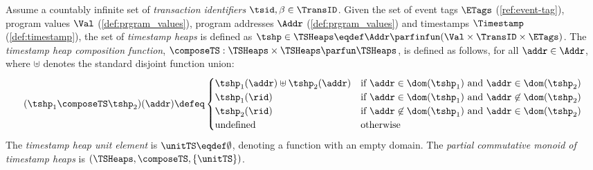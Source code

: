 \begin{defn}
\label{def:timestamp_heaps}
Assume a countably infinite set of \emph{transaction identifiers} $\tsid, \beta \in \TransID$.
Given the set of event tags $\ETags$ (\ref{ref:event-tag}), program values $\Val$ (\ref{def:prgram_values}), program addresses $\Addr$ (\ref{def:prgram_values}) and timestamps \(\Timestamp\) (\ref{def:timestamp}), the set of \emph{timestamp heaps} is defined as $\tshp \in \TSHeaps \eqdef \Addr \parfinfun (\Val \times \TransID \times \ETags)$.
The \emph{timestamp heap composition function}, $\composeTS: \TSHeaps \times \TSHeaps \parfun \TSHeaps$, is defined as follows, for all $\addr \in \Addr$, where $\uplus$ denotes the standard disjoint function union:
%
\[
	(\tshp_1 \composeTS \tshp_2)(\addr) \defeq 
	\begin{cases}
		\tshp_1(\addr) \uplus \tshp_2(\addr) & \text{if } \addr \in \dom(\tshp_1) \text{ and } \addr \in \dom(\tshp_2) \\
		\tshp_1(\rid) & \text{if } \addr \in \dom(\tshp_1) \text{ and } \addr \not\in \dom(\tshp_2) \\
		\tshp_2(\rid) & \text{if } \addr \not\in \dom(\tshp_1) \text{ and } \addr \in \dom(\tshp_2) \\
		\text{undefined} & \text{otherwise}
	\end{cases}
\]
%
The \emph{timestamp heap unit element} is $\unitTS \eqdef \emptyset$, denoting a function with an empty domain.
The \emph{partial commutative monoid of timestamp heaps} is $(\TSHeaps, \composeTS, \{\unitTS\})$. 
\end{defn}
 
